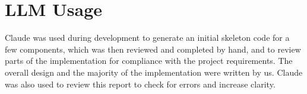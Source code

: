 \section{LLM Usage}
Claude was used during development to generate an initial skeleton code for a few components, which was then reviewed and completed by hand, and to review parts of the implementation for compliance with the project requirements. The overall design and the majority of the implementation were written by us. Claude was also used to review this report to check for errors and increase clarity.